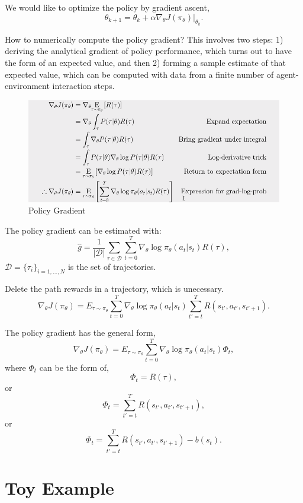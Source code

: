 \documentclass{article}
\begin{document}
    We would like to optimize the policy by gradient ascent, 
    $$
    \theta_{k+1} = \theta_k + \alpha \nabla_{\theta} J(\pi_{\theta})|_{\theta_k}.
    $$

    How to numerically compute the policy gradient? This involves two steps: 1) deriving the analytical gradient of policy performance, which turns out to have the form of an expected value, and then 2) forming a sample estimate of that expected value, which can be computed with data from a finite number of agent-environment interaction steps.
    \begin{figure}[H]
      \includegraphics[width=\linewidth]{derivative.png}
      \caption{Policy Gradient}
      \label{fig:policygradient}
    \end{figure}

    The policy gradient can be estimated with: 
    $$
    \hat{g} = \frac{1}{|\mathcal{D}|} \sum_{\tau \in \mathcal{D}} \sum_{t=0}^{T} \nabla_{\theta} \log \pi_{\theta}(a_t |s_t) R(\tau),
    $$
    $\mathcal{D} = \{\tau_i\}_{i=1,...,N}$ is the set of trajectories.

    Delete the path rewards in a trajectory, which is unecessary.
    $$
    \nabla_{\theta} J(\pi_{\theta}) = E_{\tau \sim \pi_{\theta}}{\sum_{t=0}^{T} \nabla_{\theta} \log \pi_{\theta}(a_t |s_t) \sum_{t'=t}^T R(s_{t'}, a_{t'}, s_{t'+1})}.
    $$

    The policy gradient has the general form, 
    $$
    \nabla_{\theta} J(\pi_{\theta}) = E_{\tau \sim \pi_{\theta}}{\sum_{t=0}^{T} \nabla_{\theta} \log \pi_{\theta}(a_t |s_t) \Phi_t},
    $$
    where $\Phi_t$ can be the form of, 
    $$
    \Phi_t = R(\tau),
    $$
    or 
    $$
    \Phi_t = \sum_{t'=t}^T R(s_{t'}, a_{t'}, s_{t'+1}),
    $$
    or 
    $$
    \Phi_t = \sum_{t'=t}^T R(s_{t'}, a_{t'}, s_{t'+1}) - b(s_t).
    $$
\section{Toy Example}
\end{document}
